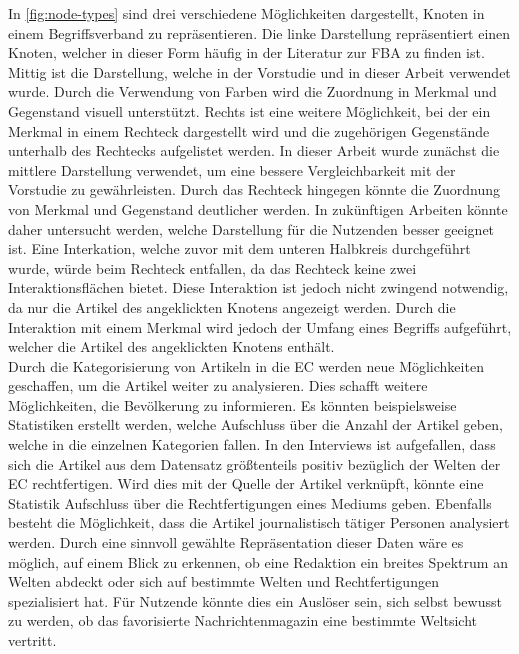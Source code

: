 In \autoref{fig:node-types} sind drei verschiedene Möglichkeiten dargestellt, Knoten in einem Begriffsverband zu repräsentieren.
Die linke Darstellung repräsentiert einen Knoten, welcher in dieser Form häufig in der Literatur zur \ac{FBA} zu finden ist.
Mittig ist die Darstellung, welche in der Vorstudie und in dieser Arbeit verwendet wurde.
Durch die Verwendung von Farben wird die Zuordnung in Merkmal und Gegenstand visuell unterstützt.
Rechts ist eine weitere Möglichkeit, bei der ein Merkmal in einem Rechteck dargestellt wird und die zugehörigen Gegenstände unterhalb des Rechtecks aufgelistet werden.
In dieser Arbeit wurde zunächst die mittlere Darstellung verwendet, um eine bessere Vergleichbarkeit mit der Vorstudie zu gewährleisten.
Durch das Rechteck hingegen könnte die Zuordnung von Merkmal und Gegenstand deutlicher werden.
In zukünftigen Arbeiten könnte daher untersucht werden, welche Darstellung für die Nutzenden besser geeignet ist.
Eine Interkation, welche zuvor mit dem unteren Halbkreis durchgeführt wurde, würde beim Rechteck entfallen, da das Rechteck keine zwei Interaktionsflächen bietet.
Diese Interaktion ist jedoch nicht zwingend notwendig, da nur die Artikel des angeklickten Knotens angezeigt werden.
Durch die Interaktion mit einem Merkmal wird jedoch der Umfang eines Begriffs aufgeführt, welcher die Artikel des angeklickten Knotens enthält.\\

Durch die Kategorisierung von Artikeln in die \ac{EC} werden neue Möglichkeiten geschaffen, um die Artikel weiter zu analysieren.
Dies schafft weitere Möglichkeiten, die Bevölkerung zu informieren.
Es könnten beispielsweise Statistiken erstellt werden, welche Aufschluss über die Anzahl der Artikel geben, welche in die einzelnen Kategorien fallen.
In den Interviews ist aufgefallen, dass sich die Artikel aus dem Datensatz größtenteils positiv bezüglich der Welten der \ac{EC} rechtfertigen.
Wird dies mit der Quelle der Artikel verknüpft, könnte eine Statistik Aufschluss über die Rechtfertigungen eines Mediums geben.
Ebenfalls besteht die Möglichkeit, dass die Artikel journalistisch tätiger Personen analysiert werden.
Durch eine sinnvoll gewählte Repräsentation dieser Daten wäre es möglich, auf einem Blick zu erkennen, ob eine Redaktion ein breites Spektrum an Welten abdeckt oder sich auf bestimmte Welten und Rechtfertigungen spezialisiert hat.
Für Nutzende könnte dies ein Auslöser sein, sich selbst bewusst zu werden, ob das favorisierte Nachrichtenmagazin eine bestimmte Weltsicht vertritt. \\


